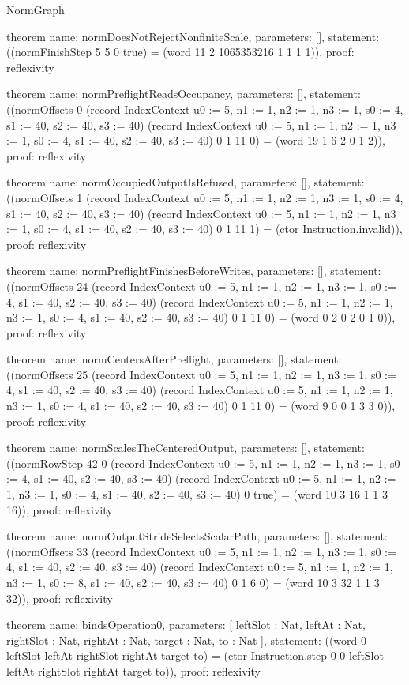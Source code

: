 \begin{lexlean}{NormGraph}
\begin{semanticmodule}
theorem{
  name: normDoesNotRejectNonfiniteScale,
  parameters: [],
  statement: ((normFinishStep 5 5 0 true) = (word 11 2 1065353216 1 1 1 1)),
  proof: reflexivity{}
}

theorem{
  name: normPreflightReadsOccupancy,
  parameters: [],
  statement: ((normOffsets 0 (record IndexContext {u0 := 5, n1 := 1, n2 := 1, n3 := 1, s0 := 4, s1 := 40, s2 := 40, s3 := 40}) (record IndexContext {u0 := 5, n1 := 1, n2 := 1, n3 := 1, s0 := 4, s1 := 40, s2 := 40, s3 := 40}) 0 1 11 0) = (word 19 1 6 2 0 1 2)),
  proof: reflexivity{}
}

theorem{
  name: normOccupiedOutputIsRefused,
  parameters: [],
  statement: ((normOffsets 1 (record IndexContext {u0 := 5, n1 := 1, n2 := 1, n3 := 1, s0 := 4, s1 := 40, s2 := 40, s3 := 40}) (record IndexContext {u0 := 5, n1 := 1, n2 := 1, n3 := 1, s0 := 4, s1 := 40, s2 := 40, s3 := 40}) 0 1 11 1) = (ctor Instruction.invalid)),
  proof: reflexivity{}
}

theorem{
  name: normPreflightFinishesBeforeWrites,
  parameters: [],
  statement: ((normOffsets 24 (record IndexContext {u0 := 5, n1 := 1, n2 := 1, n3 := 1, s0 := 4, s1 := 40, s2 := 40, s3 := 40}) (record IndexContext {u0 := 5, n1 := 1, n2 := 1, n3 := 1, s0 := 4, s1 := 40, s2 := 40, s3 := 40}) 0 1 11 0) = (word 0 2 0 2 0 1 0)),
  proof: reflexivity{}
}

theorem{
  name: normCentersAfterPreflight,
  parameters: [],
  statement: ((normOffsets 25 (record IndexContext {u0 := 5, n1 := 1, n2 := 1, n3 := 1, s0 := 4, s1 := 40, s2 := 40, s3 := 40}) (record IndexContext {u0 := 5, n1 := 1, n2 := 1, n3 := 1, s0 := 4, s1 := 40, s2 := 40, s3 := 40}) 0 1 11 0) = (word 9 0 0 1 3 3 0)),
  proof: reflexivity{}
}

theorem{
  name: normScalesTheCenteredOutput,
  parameters: [],
  statement: ((normRowStep 42 0 (record IndexContext {u0 := 5, n1 := 1, n2 := 1, n3 := 1, s0 := 4, s1 := 40, s2 := 40, s3 := 40}) (record IndexContext {u0 := 5, n1 := 1, n2 := 1, n3 := 1, s0 := 4, s1 := 40, s2 := 40, s3 := 40}) 0 true) = (word 10 3 16 1 1 3 16)),
  proof: reflexivity{}
}

theorem{
  name: normOutputStrideSelectsScalarPath,
  parameters: [],
  statement: ((normOffsets 33 (record IndexContext {u0 := 5, n1 := 1, n2 := 1, n3 := 1, s0 := 4, s1 := 40, s2 := 40, s3 := 40}) (record IndexContext {u0 := 5, n1 := 1, n2 := 1, n3 := 1, s0 := 8, s1 := 40, s2 := 40, s3 := 40}) 0 1 6 0) = (word 10 3 32 1 1 3 32)),
  proof: reflexivity{}
}

theorem{
  name: bindsOperation0,
  parameters: [
    leftSlot : Nat,
    leftAt : Nat,
    rightSlot : Nat,
    rightAt : Nat,
    target : Nat,
    to : Nat
  ],
  statement: ((word 0 leftSlot leftAt rightSlot rightAt target to) = (ctor Instruction.step 0 0 leftSlot leftAt rightSlot rightAt target to)),
  proof: reflexivity{}
}


\end{semanticmodule}
\end{lexlean}
